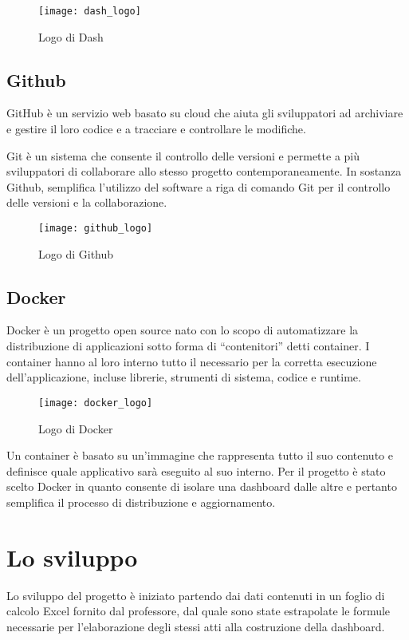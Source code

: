 \begin{figure}[htp]
    \centering
    \texttt{[image: dash\_logo]}
    \caption{Logo di Dash}
\end{figure}


\subsection{Github}
\noindent GitHub è un servizio web basato su cloud che aiuta gli sviluppatori ad archiviare e gestire il loro codice e a tracciare e controllare le modifiche.

\noindent Git è un sistema che consente il controllo delle versioni e permette a più sviluppatori di collaborare allo stesso progetto contemporaneamente.
\noindent In sostanza Github, semplifica l’utilizzo del software a riga di comando Git per il controllo delle versioni e la collaborazione.


\begin{figure}[htp]
    \centering
    \texttt{[image: github\_logo]}
    \caption{Logo di Github}
\end{figure}

\subsection{Docker}
\noindent Docker è un progetto open source nato con lo scopo di automatizzare la distribuzione di applicazioni sotto forma di “contenitori” detti container.
I container hanno al loro interno tutto il necessario per la corretta esecuzione dell’applicazione, incluse librerie, strumenti di sistema, codice e runtime.

\begin{figure}[htp]
    \centering
    \texttt{[image: docker\_logo]}
    \caption{Logo di Docker}
\end{figure}

\noindent Un container è basato su un’immagine che rappresenta tutto il suo contenuto e definisce quale applicativo sarà eseguito al suo interno. 
Per il progetto è stato scelto Docker in quanto consente di isolare una dashboard dalle altre e pertanto semplifica il processo di distribuzione e aggiornamento.

\section{Lo sviluppo}
Lo sviluppo del progetto è iniziato partendo dai dati contenuti in un foglio di calcolo Excel fornito dal professore, dal quale sono state estrapolate le formule necessarie per l’elaborazione degli stessi atti alla costruzione della dashboard.

